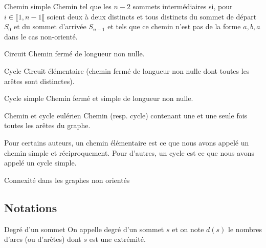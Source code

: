 \begin{defi}{Chemin simple}
Chemin tel que les $n - 2$ sommets intermédiaires si, pour $i \in \llbracket 1, n-1\llbracket$ soient
deux à deux distincts et tous distincts du sommet de départ $S_0$ et du sommet d’arrivée $S_{n-1}$ et tels
que ce chemin n’est pas de la forme $a, b, a$ dans le cas non-orienté.
\end{defi}

\begin{defi}{Circuit}
Chemin fermé de longueur non nulle.
\end{defi}


\begin{defi}{Cycle}
Circuit élémentaire (chemin fermé de longueur non nulle dont toutes les arêtes sont distinctes).
\end{defi}

\begin{defi}{Cycle simple} 
Chemin fermé et simple de longueur non nulle.
\end{defi}

\begin{defi}{Chemin et cycle eulérien}
Chemin (resp. cycle) contenant une et une seule fois toutes les arêtes du graphe.
\end{defi}

\begin{rem}
Pour certains auteurs, un chemin élémentaire est ce que nous avons appelé un chemin simple et réciproquement. Pour d’autres, un cycle est ce que nous avons appelé un cycle simple.
\end{rem}

%



\begin{defi}{Connexité dans les graphes non orientés}
\end{defi}

\subsection{Notations}
\begin{defi}{Degré d'un sommet}
On appelle degré d'un sommet $s$ et on note $d\left(s\right)$ le nombres d'arcs (ou d'arêtes) dont $s$ est une extrémité.
\end{defi}

